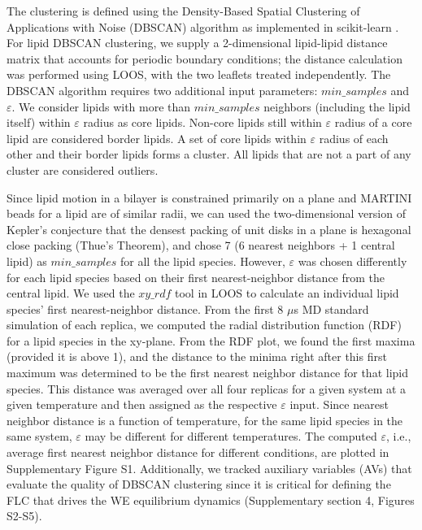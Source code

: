 \documentclass{biophys-new}
\begin{document}
The clustering is defined using the Density-Based Spatial Clustering of Applications with Noise (DBSCAN) algorithm \cite{MartinEsterHans-PeterKriegelJiirgSander1996, Ester2017} as implemented in scikit-learn \cite{PedregosaF.VaroquauxG.GramfortA.MichelV.ThirionB.GriselO.BlondelM.PrettenhoferP.WeissR.andDubourgV.VanderplasJ.PassosA.CournapeauD.BrucherM.PerrotM.Duchesnay2011}.
For lipid DBSCAN clustering, we supply a 2-dimensional lipid-lipid distance matrix that accounts for periodic boundary conditions; the distance calculation was performed using LOOS, with the two leaflets treated independently.
The DBSCAN algorithm requires two additional input parameters: $min\_samples$ and $\varepsilon$.
We consider lipids with more than $min\_samples$ neighbors (including the lipid itself) within $\varepsilon$ radius as core lipids.
Non-core lipids still within $\varepsilon$ radius of a core lipid are considered border lipids.
A set of core lipids within $\varepsilon$ radius of each other and their border lipids forms a cluster.
All lipids that are not a part of any cluster are considered outliers.

Since lipid motion in a bilayer is constrained primarily on a plane and MARTINI beads for a lipid are of similar radii, we can used the two-dimensional version of Kepler's conjecture that the densest packing of unit disks in a plane is hexagonal close packing (Thue's Theorem), and
chose 7 (6 nearest neighbors + 1 central lipid) as $min\_samples$ for all the lipid species.
However, $\varepsilon$ was chosen differently for each lipid species based on their first nearest-neighbor distance from the central lipid.
We used the $xy\_rdf$ tool in LOOS to calculate an individual lipid species' first nearest-neighbor distance.
From the first 8 $\mu$s MD standard simulation of each replica, we computed the radial distribution function (RDF) for a lipid species in the xy-plane.
From the RDF plot, we found the first maxima (provided it is above 1), and the distance to the minima right after this first maximum was determined to be the first nearest neighbor distance for that lipid species.
This distance was averaged over all four replicas for a given system at a given temperature and then assigned as the respective $\varepsilon$ input.
Since nearest neighbor distance is a function of temperature, for the same lipid species in the same system, $\varepsilon$ may be different for different temperatures.
The computed $\varepsilon$, i.e., average first nearest neighbor distance for different conditions, are plotted in Supplementary Figure S1.
Additionally, we tracked auxiliary variables (AVs) that evaluate the quality of DBSCAN clustering since it is critical for defining the FLC that drives the WE equilibrium dynamics (Supplementary section 4, Figures S2-S5).
\end{document}
